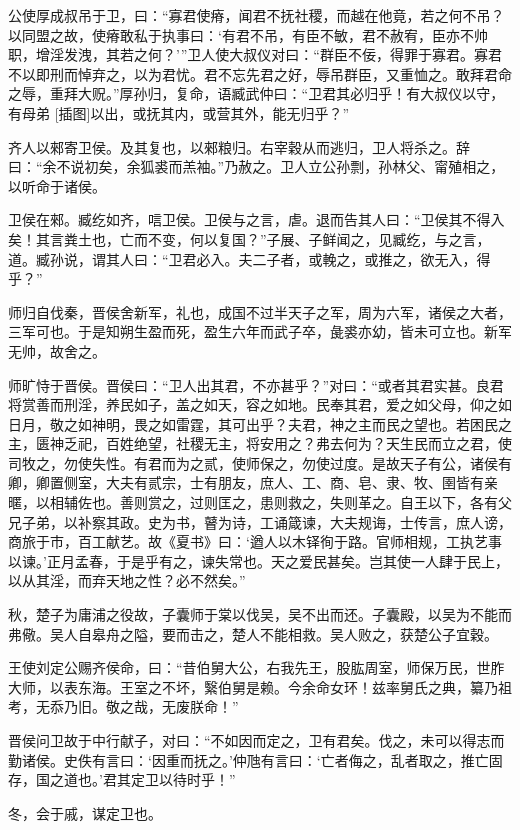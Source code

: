 \documentclass[a4paper,12pt,UTF8,twoside]{ctexbook}
\begin{document}
公使厚成叔吊于卫，曰：“寡君使瘠，闻君不抚社稷，而越在他竟，若之何不吊？以同盟之故，使瘠敢私于执事曰：‘有君不吊，有臣不敏，君不赦宥，臣亦不帅职，增淫发洩，其若之何？’”卫人使大叔仪对曰：“群臣不佞，得罪于寡君。寡君不以即刑而悼弃之，以为君忧。君不忘先君之好，辱吊群臣，又重恤之。敢拜君命之辱，重拜大贶。”厚孙归，复命，语臧武仲曰：“卫君其必归乎！有大叔仪以守，有母弟 [插图]以出，或抚其内，或营其外，能无归乎？”

齐人以郲寄卫侯。及其复也，以郲粮归。右宰穀从而逃归，卫人将杀之。辞曰：“余不说初矣，余狐裘而羔袖。”乃赦之。卫人立公孙剽，孙林父、甯殖相之，以听命于诸侯。

卫侯在郲。臧纥如齐，唁卫侯。卫侯与之言，虐。退而告其人曰：“卫侯其不得入矣！其言粪土也，亡而不变，何以复国？”子展、子鲜闻之，见臧纥，与之言，道。臧孙说，谓其人曰：“卫君必入。夫二子者，或輓之，或推之，欲无入，得乎？”

师归自伐秦，晋侯舍新军，礼也，成国不过半天子之军，周为六军，诸侯之大者，三军可也。于是知朔生盈而死，盈生六年而武子卒，彘裘亦幼，皆未可立也。新军无帅，故舍之。

师旷恃于晋侯。晋侯曰：“卫人出其君，不亦甚乎？”对曰：“或者其君实甚。良君将赏善而刑淫，养民如子，盖之如天，容之如地。民奉其君，爱之如父母，仰之如日月，敬之如神明，畏之如雷霆，其可出乎？夫君，神之主而民之望也。若困民之主，匮神乏祀，百姓绝望，社稷无主，将安用之？弗去何为？天生民而立之君，使司牧之，勿使失性。有君而为之贰，使师保之，勿使过度。是故天子有公，诸侯有卿，卿置侧室，大夫有贰宗，士有朋友，庶人、工、商、皂、隶、牧、圉皆有亲暱，以相辅佐也。善则赏之，过则匡之，患则救之，失则革之。自王以下，各有父兄子弟，以补察其政。史为书，瞽为诗，工诵箴谏，大夫规诲，士传言，庶人谤，商旅于市，百工献艺。故《夏书》曰：‘遒人以木铎徇于路。官师相规，工执艺事以谏。’正月孟春，于是乎有之，谏失常也。天之爱民甚矣。岂其使一人肆于民上，以从其淫，而弃天地之性？必不然矣。”

秋，楚子为庸浦之役故，子囊师于棠以伐吴，吴不出而还。子囊殿，以吴为不能而弗儆。吴人自皋舟之隘，要而击之，楚人不能相救。吴人败之，获楚公子宜穀。

王使刘定公赐齐侯命，曰：“昔伯舅大公，右我先王，股肱周室，师保万民，世胙大师，以表东海。王室之不坏，繄伯舅是赖。今余命女环！兹率舅氏之典，纂乃祖考，无忝乃旧。敬之哉，无废朕命！”

晋侯问卫故于中行献子，对曰：“不如因而定之，卫有君矣。伐之，未可以得志而勤诸侯。史佚有言曰：‘因重而抚之。’仲虺有言曰：‘亡者侮之，乱者取之，推亡固存，国之道也。’君其定卫以待时乎！”



冬，会于戚，谋定卫也。
\end{document}

